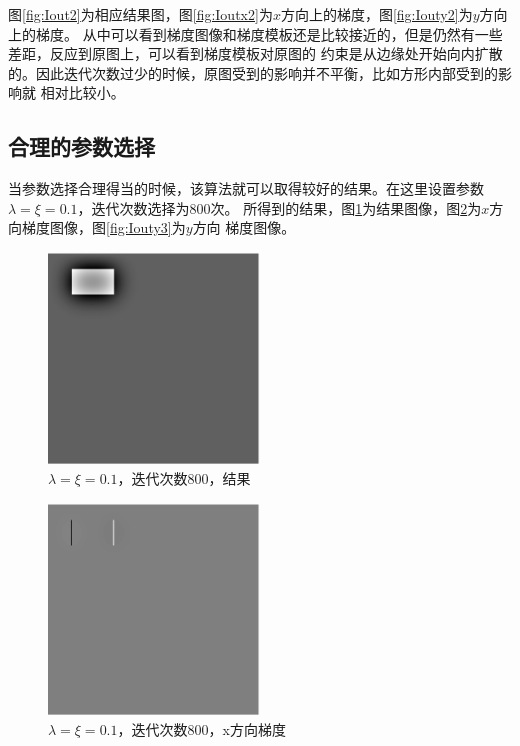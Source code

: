 图\ref{fig:Iout2}为相应结果图，图\ref{fig:Ioutx2}为$x$方向上的梯度，图\ref{fig:Iouty2}为$y$方向上的梯度。
从中可以看到梯度图像和梯度模板还是比较接近的，但是仍然有一些差距，反应到原图上，可以看到梯度模板对原图的
约束是从边缘处开始向内扩散的。因此迭代次数过少的时候，原图受到的影响并不平衡，比如方形内部受到的影响就
相对比较小。

\FloatBarrier
\subsection{合理的参数选择}
当参数选择合理得当的时候，该算法就可以取得较好的结果。在这里设置参数$\lambda=\xi=0.1$，迭代次数选择为$800$次。
所得到的结果，图\ref{fig:Iout3}为结果图像，图\ref{fig:Ioutx3}为$x$方向梯度图像，图\ref{fig:Iouty3}为$y$方向
梯度图像。
\begin{figure}[h!]
\center
\includegraphics[width=0.5\textwidth]{figure/gradtest/Iout3}
\caption{$\lambda=\xi=0.1$，迭代次数800，结果}\label{fig:Iout3}
\end{figure}
\begin{figure}[h!]
\center
\includegraphics[width=0.5\textwidth]{figure/gradtest/Ioutx3}
\caption{$\lambda=\xi=0.1$，迭代次数800，x方向梯度}\label{fig:Ioutx3}
\end{figure}

